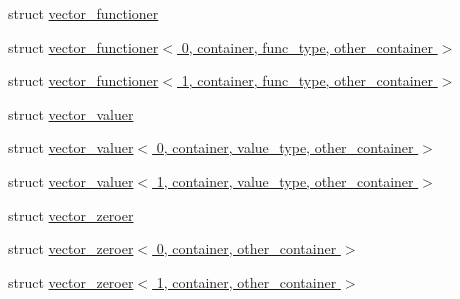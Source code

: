 \begin{DoxyCompactItemize}
\item 
struct \hyperlink{structIceBRG_1_1vector__functioner}{vector\+\_\+functioner}
\item 
struct \hyperlink{structIceBRG_1_1vector__functioner_3_010_00_01container_00_01func__type_00_01other__container_01_4}{vector\+\_\+functioner$<$ 0, container, func\+\_\+type, other\+\_\+container $>$}
\item 
struct \hyperlink{structIceBRG_1_1vector__functioner_3_011_00_01container_00_01func__type_00_01other__container_01_4}{vector\+\_\+functioner$<$ 1, container, func\+\_\+type, other\+\_\+container $>$}
\item 
struct \hyperlink{structIceBRG_1_1vector__valuer}{vector\+\_\+valuer}
\item 
struct \hyperlink{structIceBRG_1_1vector__valuer_3_010_00_01container_00_01value__type_00_01other__container_01_4}{vector\+\_\+valuer$<$ 0, container, value\+\_\+type, other\+\_\+container $>$}
\item 
struct \hyperlink{structIceBRG_1_1vector__valuer_3_011_00_01container_00_01value__type_00_01other__container_01_4}{vector\+\_\+valuer$<$ 1, container, value\+\_\+type, other\+\_\+container $>$}
\item 
struct \hyperlink{structIceBRG_1_1vector__zeroer}{vector\+\_\+zeroer}
\item 
struct \hyperlink{structIceBRG_1_1vector__zeroer_3_010_00_01container_00_01other__container_01_4}{vector\+\_\+zeroer$<$ 0, container, other\+\_\+container $>$}
\item 
struct \hyperlink{structIceBRG_1_1vector__zeroer_3_011_00_01container_00_01other__container_01_4}{vector\+\_\+zeroer$<$ 1, container, other\+\_\+container $>$}
\end{DoxyCompactItemize}
